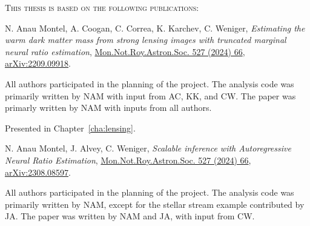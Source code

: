 
{\scshape This thesis is based on the following publications:} \vskip 20pt


\begin{itemize}[]

{\selectfont

\item [\cite{Montel:2022fhv}]

{N. Anau Montel}, A. Coogan, C. Correa, K. Karchev, C. Weniger, \textit{Estimating the warm dark matter mass from strong lensing images with truncated marginal neural ratio estimation}, 
\href{https://doi.org/10.1093/mnras/stad2925}{Mon.Not.Roy.Astron.Soc. 527 (2024) 66}, \href{https://arxiv.org/abs/2209.09918}{\ttfamily arXiv:2209.09918}. \vskip 5pt

{All authors participated in the planning of the project. The analysis code was primarily written by NAM with input from AC, KK, and CW. The paper was primarly written by NAM with inputs from all authors.}   \vskip 5pt

Presented in Chapter~\ref{cha:lensing}.\vskip 10pt
 
 
% 
%
%


\item[\cite{AnauMontel:2023stj}] 
{N. Anau Montel}, J. Alvey, C. Weniger, \textit{Scalable inference with Autoregressive Neural Ratio Estimation}, \href{https://doi.org/10.1093/mnras/stae1130}{Mon.Not.Roy.Astron.Soc. 527 (2024) 66},  \href{https://arxiv.org/abs/2308.08597}{\ttfamily arXiv:2308.08597}.  \vskip 5pt

{All authors participated in the planning of the project. The analysis code was primarily written by NAM, except for the stellar stream example contributed by JA. The paper was written by NAM and JA, with input from CW.}   \vskip 5pt

}
\end{itemize}
